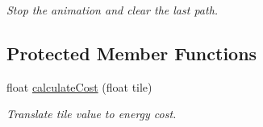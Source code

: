 \begin{DoxyCompactItemize}
\begin{DoxyCompactList}\small\item\em Stop the animation and clear the last path. \end{DoxyCompactList}\end{DoxyCompactItemize}
\subsection*{Protected Member Functions}
\begin{DoxyCompactItemize}
\item 
float \hyperlink{classWorldAbstractController_a556c8e2b55b017f5e837db2b58d3553e}{calculate\+Cost} (float tile)
\begin{DoxyCompactList}\small\item\em Translate tile value to energy cost. \end{DoxyCompactList}\end{DoxyCompactItemize}
